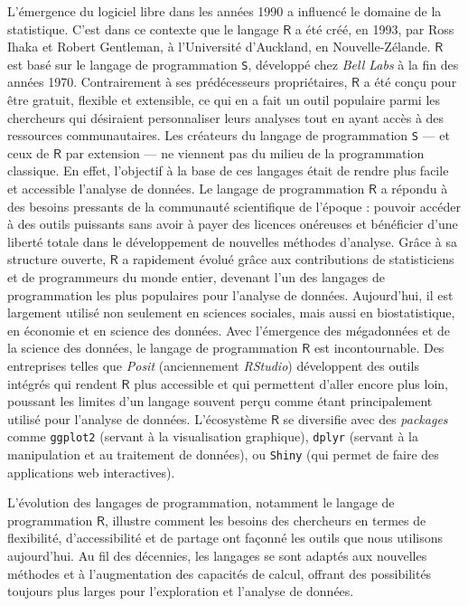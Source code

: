 \documentclass[
  letterpaper,
  DIV=11,
  numbers=noendperiod,
  oneside]{scrreprt}
\begin{document}
L'émergence du logiciel libre dans les années 1990 a influencé le
domaine de la statistique. C'est dans ce contexte que le langage
\(\textsf{R}\) a été créé, en 1993, par Ross Ihaka et Robert Gentleman,
à l'Université d'Auckland, en Nouvelle-Zélande. \(\textsf{R}\) est basé
sur le langage de programmation \texttt{S}, développé chez \emph{Bell
Labs} à la fin des années 1970. Contrairement à ses prédécesseurs
propriétaires, \(\textsf{R}\) a été conçu pour être gratuit, flexible et
extensible, ce qui en a fait un outil populaire parmi les chercheurs qui
désiraient personnaliser leurs analyses tout en ayant accès à des
ressources communautaires. Les créateurs du langage de programmation
\texttt{S} --- et ceux de \(\textsf{R}\) par extension --- ne viennent
pas du milieu de la programmation classique. En effet, l'objectif à la
base de ces langages était de rendre plus facile et accessible l'analyse
de données. Le langage de programmation \(\textsf{R}\) a répondu à des
besoins pressants de la communauté scientifique de l'époque : pouvoir
accéder à des outils puissants sans avoir à payer des licences onéreuses
et bénéficier d'une liberté totale dans le développement de nouvelles
méthodes d'analyse. Grâce à sa structure ouverte, \(\textsf{R}\) a
rapidement évolué grâce aux contributions de statisticiens et de
programmeurs du monde entier, devenant l'un des langages de
programmation les plus populaires pour l'analyse de données.
Aujourd'hui, il est largement utilisé non seulement en sciences
sociales, mais aussi en biostatistique, en économie et en science des
données. Avec l'émergence des mégadonnées et de la science des données,
le langage de programmation \(\textsf{R}\) est incontournable. Des
entreprises telles que \emph{Posit} (anciennement \emph{RStudio})
développent des outils intégrés qui rendent \(\textsf{R}\) plus
accessible et qui permettent d'aller encore plus loin, poussant les
limites d'un langage souvent perçu comme étant principalement utilisé
pour l'analyse de données. L'écosystème \(\textsf{R}\) se diversifie
avec des \emph{packages} comme \texttt{ggplot2} (servant à la
visualisation graphique), \texttt{dplyr} (servant à la manipulation et
au traitement de données), ou \texttt{Shiny} (qui permet de faire des
applications web interactives).

L'évolution des langages de programmation, notamment le langage de
programmation \(\textsf{R}\), illustre comment les besoins des
chercheurs en termes de flexibilité, d'accessibilité et de partage ont
façonné les outils que nous utilisons aujourd'hui. Au fil des décennies,
les langages se sont adaptés aux nouvelles méthodes et à l'augmentation
des capacités de calcul, offrant des possibilités toujours plus larges
pour l'exploration et l'analyse de données.
\end{document}
